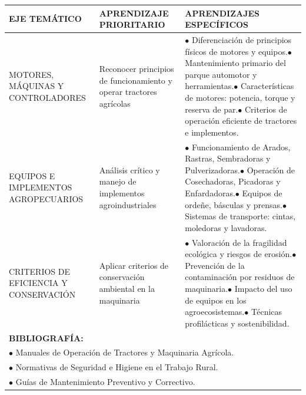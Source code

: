 \documentclass[a4paper,landscape]{article}
\begin{document}
\begin{center}
\begin{tabularx}{0.98\textwidth}{|p{4cm}|p{6cm}|X|}
\hline
\rowcolor{gray!20}\fontsize{10pt}{12pt}\selectfont\bfseries EJE TEMÁTICO & \textbf{APRENDIZAJE PRIORITARIO} & \textbf{APRENDIZAJES ESPECÍFICOS} \\ \hline
\fontsize{10pt}{12pt}\selectfont MOTORES, MÁQUINAS Y CONTROLADORES & Reconocer principios de funcionamiento y operar tractores agrícolas & $\bullet$ Diferenciación de principios físicos de motores y equipos.\newline $\bullet$ Mantenimiento primario del parque automotor y herramientas.\newline $\bullet$ Características de motores: potencia, torque y reserva de par.\newline $\bullet$ Criterios de operación eficiente de tractores e implementos. \\ \hline
\fontsize{10pt}{12pt}\selectfont EQUIPOS E IMPLEMENTOS AGROPECUARIOS & Análisis crítico y manejo de implementos agroindustriales & $\bullet$ Funcionamiento de Arados, Rastras, Sembradoras y Pulverizadoras.\newline $\bullet$ Operación de Cosechadoras, Picadoras y Enfardadoras.\newline $\bullet$ Equipos de ordeñe, básculas y prensas.\newline $\bullet$ Sistemas de transporte: cintas, moledoras y lavadoras. \\ \hline
\fontsize{10pt}{12pt}\selectfont CRITERIOS DE EFICIENCIA Y CONSERVACIÓN & Aplicar criterios de conservación ambiental en la maquinaria & $\bullet$ Valoración de la fragilidad ecológica y riesgos de erosión.\newline $\bullet$ Prevención de la contaminación por residuos de maquinaria.\newline $\bullet$ Impacto del uso de equipos en los agroecosistemas.\newline $\bullet$ Técnicas profilácticas y sostenibilidad. \\ \hline
\multicolumn{3}{|l|}{\textbf{BIBLIOGRAFÍA:}} \\ \hline
\multicolumn{3}{|l|}{$\bullet$ Manuales de Operación de Tractores y Maquinaria Agrícola.} \\ \hline
\multicolumn{3}{|l|}{$\bullet$ Normativas de Seguridad e Higiene en el Trabajo Rural.} \\ \hline
\multicolumn{3}{|l|}{$\bullet$ Guías de Mantenimiento Preventivo y Correctivo.} \\ \hline
\end{tabularx}
\end{center}
\end{document}
